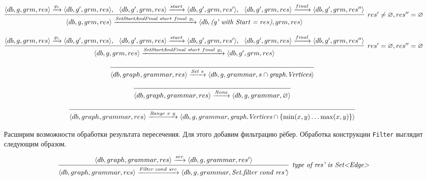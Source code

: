 {
\scriptsize
$$
\infer[res' \neq \varnothing, res'' = \varnothing]{\langle db, g, grm, res\rangle \xrightarrow{\textit{SetStartAndFinal} \ start \ final \ g_1} \langle db, \textit{(g' with Start = $res$)}, grm, res\rangle}{\langle db, g, grm, res\rangle \xrightarrow{g_1} \langle db, g', grm, res \rangle, \ \ \langle db, g', grm, res \rangle \xrightarrow{start} \langle db, g', grm, res' \rangle, \ \ \langle db, g', grm, res \rangle \xrightarrow{final} \langle db, g', grm, res'' \rangle}
$$
}


{
\scriptsize
$$
\infer[res' = \varnothing, res'' = \varnothing]{\langle db, g, grm, res\rangle \xrightarrow{\textit{SetStartAndFinal} \ start \ final \ g_1} \langle db, g', grm, res\rangle}{\langle db, g, grm, res\rangle \xrightarrow{g_1} \langle db, g', grm, res \rangle, \ \ \langle db, g', grm, res \rangle \xrightarrow{start} \langle db, g', grm, res' \rangle, \ \ \langle db, g', grm, res \rangle \xrightarrow{final} \langle db, g', grm, res'' \rangle}
$$
}

$$
\infer[]{\langle db, graph, grammar, res \rangle \xrightarrow{\textit{Set} \ s} \langle db, g, grammar, s \cap \textit{graph.Vertices} \rangle}{}
$$


$$
\infer[]{\langle db, graph, grammar, res \rangle \xrightarrow{\textit{None}} \langle db, g, grammar, \varnothing \rangle}{}
$$

$$
\infer[]{\langle db, graph, grammar, res \rangle \xrightarrow{\textit{Range} \ x \ y} \langle db, g, grammar, \textit{graph.Vertices} \cap \{ \min(x,y) \ldots \max(x,y)\} \rangle}{}
$$

Расширим возможности обработки результата пересечения. Для этого добавим фильтрацию рёбер. Обработка конструкции \verb|Filter| выглядит следующим образом.

$$
\infer[\textit{type of res' is Set<Edge>}]{\langle db, graph, grammar, res \rangle \xrightarrow{\textit{Filter} \ cond \ src} \langle db, g, grammar, \textit{Set.filter cond res'} \rangle}{\langle db, graph, grammar, res \rangle \xrightarrow{src} \langle db, g, grammar, res' \rangle}
$$
